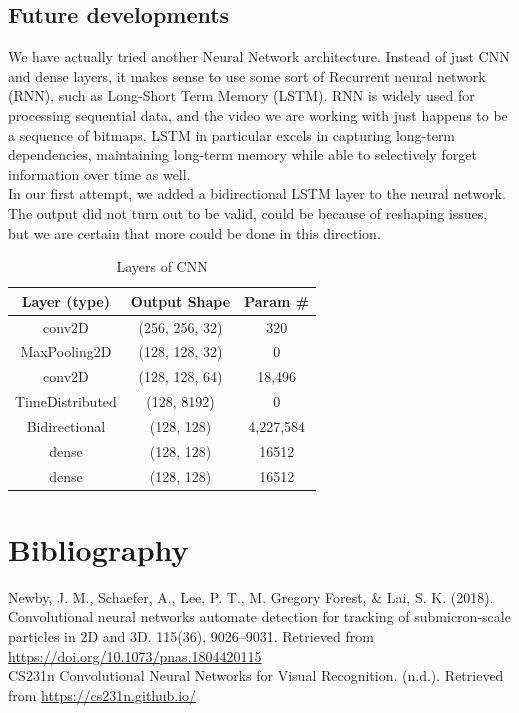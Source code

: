 \documentclass[11pt,a4paper]{scrartcl}
\begin{document}
\subsection{Future developments}
We have actually tried another Neural Network architecture. Instead of just CNN and dense layers, it makes sense to use some sort of Recurrent neural network (RNN), such as Long-Short Term Memory (LSTM). RNN is widely used for processing sequential data, and the video we are working with just happens to be a sequence of bitmaps. LSTM in particular excels in capturing long-term dependencies, maintaining long-term memory while able to selectively forget information over time as well.\\

In our first attempt, we added a bidirectional LSTM layer to the neural network. The output did not turn out to be valid, could be because of reshaping issues, but we are certain that more could be done in this direction.

\begin{table}[H]
\centering
\begin{tabular}{ccc}
\toprule
\textbf{Layer (type)} & \textbf{Output Shape} & \textbf{Param \#} \\
\midrule
conv2D & (256, 256, 32) & 320 \\
MaxPooling2D & (128, 128, 32) & 0 \\
conv2D & (128, 128, 64) & 18,496 \\
TimeDistributed & (128, 8192) & 0 \\
Bidirectional & (128, 128) & 4,227,584 \\
dense & (128, 128) & 16512 \\
dense & (128, 128) & 16512 \\
\bottomrule
\end{tabular}
\caption{Layers of CNN}
\end{table}

\section*{Bibliography}
Newby, J. M., Schaefer, A., Lee, P. T., M. Gregory Forest, \& Lai, S. K. (2018). Convolutional neural networks automate detection for tracking of submicron-scale particles in 2D and 3D. 115(36), 9026–9031. Retrieved from \url{https://doi.org/10.1073/pnas.1804420115}\\
CS231n Convolutional Neural Networks for Visual Recognition. (n.d.). Retrieved from \url{https://cs231n.github.io/}

\end{document}
